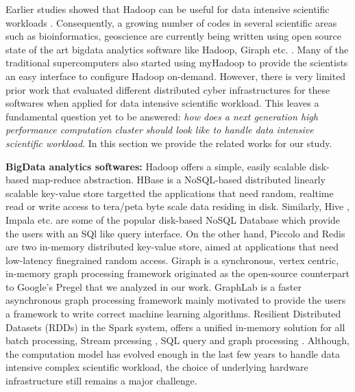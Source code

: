 Earlier studies showed that Hadoop can be useful for data intensive scientific workloads \cite{schadoop:fadika}.
Consequently, a growing number of codes in several scientific areas such as bioinformatics, geoscience are currently being written using open source state of the art bigdata analytics software like Hadoop, Giraph etc. \cite{fw:myhadoop}.
Many of the traditional supercomputers also started using myHadoop \cite{fw:myhadoop} to provide the scientists an easy interface to configure Hadoop on-demand. 
However, there is very limited prior work that evaluated different distributed cyber infrastructures for these softwares when applied for data intensive scientific workload.
This leaves a fundamental question yet to be answered: \textit{how does a next generation  high performance computation cluster should look like to handle data intensive scientific workload}.
In this section we provide the related works for our study.

\textbf{BigData analytics softwares:}
Hadoop \cite{fw:hadoop} offers a simple, easily scalable disk-based map-reduce abstraction.
HBase \cite{fw:hbase} is a NoSQL-based distributed linearly scalable key-value store targetted the applications that need random, realtime read or write access to tera/peta byte scale data residing in disk.
Similarly, Hive \cite{fw:hive}, Impala \cite{fw:impala} etc. are some of the popular disk-based NoSQL Database which provide the users with an SQl like query interface.
On the other hand, Piccolo \cite{fw:piccolo} and Redis \cite{fw:redis} are two in-memory distributed key-value store, aimed at applications that need low-latency finegrained random access. 
Giraph \cite{fw:giraph} is a synchronous, vertex centric, in-memory graph processing framework originated as the open-source counterpart to Google's Pregel \cite{fw:pregel} that we analyzed in our work.
GraphLab \cite{fw:graphlab} is a faster asynchronous graph processing framework mainly motivated to provide the users a framework to write correct machine learning algorithms.
Resilient Distributed Datasets (RDDs) \cite{fw:rdd} in the Spark system, offers a unified in-memory solution for all batch processing, Stream prcessing \cite{fw:sparkstreaming}, SQL query \cite{fw:sparksql} and graph processing \cite{fw:graphx}.
Although, the computation model has evolved enough in the last few years to handle data intensive complex scientific workload, the choice of underlying hardware infrastructure still remains a major challenge.

